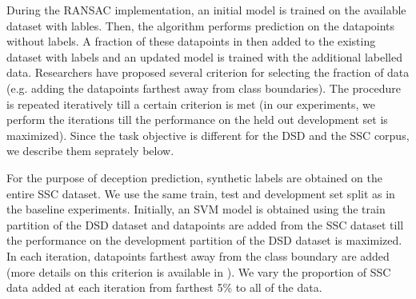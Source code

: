 \documentclass{article}
\begin{document}

During the RANSAC \cite{} implementation, an initial model is trained on the available dataset with lables.
Then, the algorithm performs prediction on the datapoints without labels.
A fraction of these datapoints in then added to the existing dataset with labels and an updated model is trained with the additional labelled data.
Researchers have proposed several criterion for selecting the fraction of data (e.g. adding the datapoints farthest away from class boundaries). 
The procedure is repeated iteratively till a certain criterion is met (in our experiments, we perform the iterations till the performance on the held out development set is maximized).
Since the task objective is different for the DSD and the SSC corpus, we describe them seprately below. 

For the purpose of deception prediction, synthetic labels are obtained on the entire SSC dataset.
We use the same train, test and development set split as in the baseline experiments.
Initially, an SVM model is obtained using the train partition of the DSD dataset and datapoints are added from the SSC dataset till the performance on the development partition of the DSD dataset is maximized.
In each iteration, datapoints farthest away from the class boundary are added (more details on this criterion is available in \cite{}).
We vary the proportion of SSC data added at each iteration from farthest 5\% to all of the data.
\end{document}
